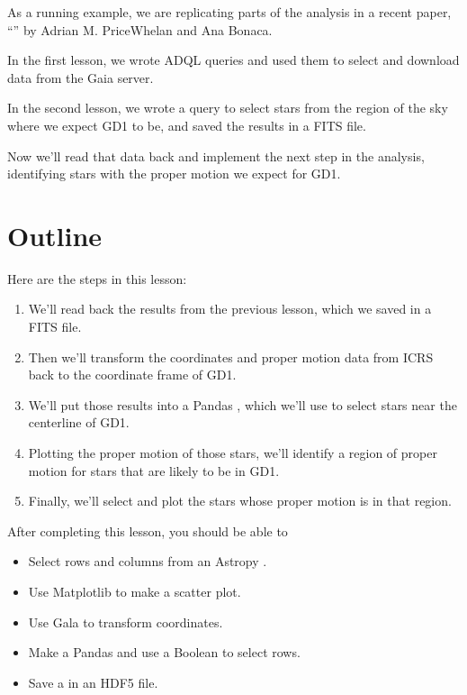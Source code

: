 \documentclass[letterpaper,10pt,english]{sphinxmanual}
\begin{document}
As a running example, we are replicating parts of the analysis in a recent paper, “” by Adrian M. Price\sphinxhyphen{}Whelan and Ana Bonaca.

In the first lesson, we wrote ADQL queries and used them to select and download data from the Gaia server.

In the second lesson, we wrote a query to select stars from the region of the sky where we expect GD\sphinxhyphen{}1 to be, and saved the results in a FITS file.

Now we’ll read that data back and implement the next step in the analysis, identifying stars with the proper motion we expect for GD\sphinxhyphen{}1.


\section{Outline}
\label{\detokenize{03_motion:outline}}
Here are the steps in this lesson:
\begin{enumerate}
%
\item {} 
We’ll read back the results from the previous lesson, which we saved in a FITS file.

\item {} 
Then we’ll transform the coordinates and proper motion data from ICRS back to the coordinate frame of GD\sphinxhyphen{}1.

\item {} 
We’ll put those results into a Pandas , which we’ll use to select stars near the centerline of GD\sphinxhyphen{}1.

\item {} 
Plotting the proper motion of those stars, we’ll identify a region of proper motion for stars that are likely to be in GD\sphinxhyphen{}1.

\item {} 
Finally, we’ll select and plot the stars whose proper motion is in that region.

\end{enumerate}

After completing this lesson, you should be able to
\begin{itemize}
\item {} 
Select rows and columns from an Astropy .

\item {} 
Use Matplotlib to make a scatter plot.

\item {} 
Use Gala to transform coordinates.

\item {} 
Make a Pandas  and use a Boolean  to select rows.

\item {} 
Save a  in an HDF5 file.

\end{itemize}
\end{document}
